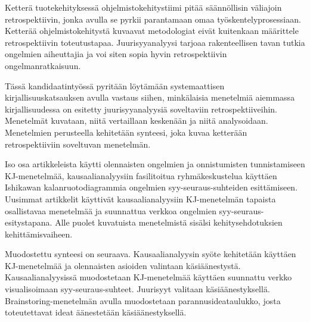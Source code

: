 %

\begin{fiabstract}

Ketterä tuotekehityksessä ohjelmistokehitystiimi pitää säännöllisin väliajoin retrospektiivin, jonka avulla se pyrkii parantamaan omaa työskentelyprosessiaan. Ketterää ohjelmistokehitystä kuvaavat metodologiat eivät kuitenkaan määrittele retrospektiivin toteutustapaa. Juurisyyanalyysi tarjoaa rakenteellisen tavan tutkia ongelmien aiheuttajia ja voi siten sopia hyvin retrospektiivin ongelmanratkaisuun. 

Tässä kandidaatintyössä pyritään löytämään systemaattisen kirjallisuuskatsauksen avulla vastaus siihen, minkälaisia menetelmiä aiemmassa kirjallisuudessa on esitetty juurisyyanalyysiä soveltaviin retrospektiiveihin. Menetelmät kuvataan, niitä vertaillaan keskenään ja niitä analysoidaan. Menetelmien perusteella kehitetään synteesi, joka kuvaa ketterään retrospektiiviin soveltuvan menetelmän.

Iso osa artikkeleista käytti olennaisten ongelmien ja onnistumisten tunnistamiseen KJ-menetelmää, kausaalianalyysiin fasilitoitua ryhmäkeskustelua käyttäen Ishikawan kalanruotodiagrammia ongelmien syy-seuraus-suhteiden esittämiseen. Uusimmat artikkelit käyttivät kausaalianalyysiin KJ-menetelmän tapaista osallistavaa menetelmää ja suunnattua verkkoa ongelmien syy-seuraus-esitystapana. Alle puolet kuvatuista menetelmistä sisälsi kehitysehdotuksien kehittämisvaiheen.

Muodostettu synteesi on seuraava. Kausaalianalyysin syöte kehitetään käyttäen KJ-menetelmää ja olennaisten asioiden valintaan käsiäänestystä. Kausaalianalyysissä muodostetaan KJ-menetelmää käyttäen suunnattu verkko visualisoimaan syy-seuraus-suhteet. Juurisyyt valitaan käsiäänestyksellä. Brainstoring-menetelmän avulla muodostetaan parannusideataulukko, josta toteutettavat ideat äänestetään käsiäänestyksellä.

\end{fiabstract}
